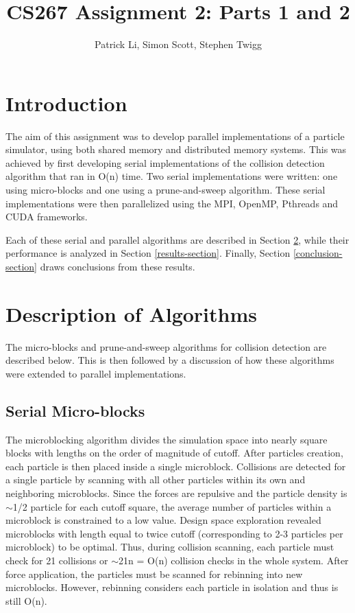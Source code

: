 \documentclass[11pt]{article} %
\title{CS267 Assignment 2: Parts 1 and 2}
\author{Patrick Li, Simon Scott, Stephen Twigg}
\begin{document}
\maketitle
\parskip 7.2pt

\section{Introduction}

The aim of this assignment was to develop parallel implementations of a particle simulator, using both shared memory and distributed memory systems. This was achieved by first developing serial implementations of the collision detection algorithm that ran in O(n) time. Two serial implementations were written: one using micro-blocks and one using a prune-and-sweep algorithm. These serial implementations were then parallelized using the MPI, OpenMP, Pthreads and CUDA frameworks.

Each of these serial and parallel algorithms are described in Section \ref{algorithm-section}, while their performance is analyzed in Section \ref{results-section}. Finally, Section \ref{conclusion-section} draws conclusions from these results.




\section{Description of Algorithms}
\label{algorithm-section}

The micro-blocks and prune-and-sweep algorithms for collision detection are described below. This is then followed by a discussion of how these algorithms were extended to parallel implementations.

\subsection{Serial Micro-blocks}

The microblocking algorithm divides the simulation space into nearly square blocks with lengths on the order of magnitude of cutoff. After particles creation, each particle is then placed inside a single microblock. Collisions are detected for a single particle by scanning with all other particles within its own and neighboring microblocks. Since the forces are repulsive and the particle density is $\sim$1/2 particle for each cutoff square, the average number of particles within a microblock is constrained to a low value. Design space exploration revealed microblocks with length equal to twice cutoff (corresponding to 2-3 particles per microblock) to be optimal. Thus, during collision scanning, each particle must check for 21 collisions or $\sim$21n = O(n) collision checks in the whole system. After force application, the particles must be scanned for rebinning into new microblocks. However, rebinning considers each particle in isolation and thus is still O(n).
\end{document}
